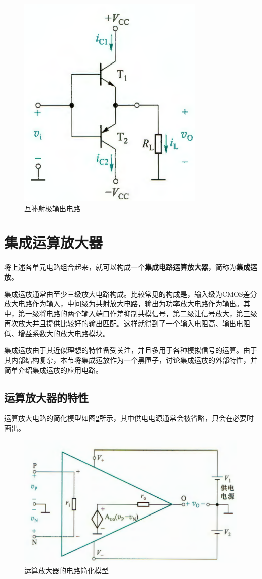 \begin{figure}[htb]
    \centering
    \includegraphics[width=0.25\linewidth]{pic/互补射极输出电路.png}
    \caption{互补射极输出电路\cite{康华光}\label{互补射极输出电路}}
\end{figure}

\section{集成运算放大器}
将上述各单元电路组合起来，就可以构成一个\textbf{集成电路运算放大器}，简称为\textbf{集成运放}。

集成运放通常由至少三级放大电路构成。比较常见的构成是，输入级为CMOS差分放大电路作为输入，中间级为共射放大电路，输出为功率放大电路作为输出。其中，第一级将电路的两个输入端口作差抑制共模信号，第二级让信号放大，第三级再次放大并且提供比较好的输出匹配。这样就得到了一个输入电阻高、输出电阻低、增益系数大的放大电路模块。

集成运放由于其近似理想的特性备受关注，并且多用于各种模拟信号的运算。由于其内部结构复杂，本节将集成运放作为一个黑匣子，讨论集成运放的外部特性，并简单介绍集成运放的应用电路。

\subsection{运算放大器的特性}
运算放大电路的简化模型如图\ref{运算放大器的电路简化模型}所示，其中供电电源通常会被省略，只会在必要时画出。

\begin{figure}[htb]
    \centering
    \includegraphics[width=0.55\linewidth]{pic/运算放大器的电路简化模型.png}
    \caption{运算放大器的电路简化模型\cite{康华光}\label{运算放大器的电路简化模型}}
\end{figure}

